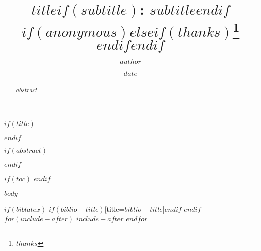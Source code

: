 \documentclass{article}
\title{$title$$if(subtitle)$: $subtitle$$endif$ $if(anonymous)$$else$$if(thanks)$\thanks{$thanks$} $endif$$endif$ }
\author{$author$}
\date{$date$}
\begin{document}
$if(title)$
\maketitle
$endif$

$if(abstract)$

\begin{abstract}
$abstract$
\end{abstract}
$endif$

$if(toc)$
{
\tableofcontents
}
$endif$

$body$

$if(biblatex)$
\printbibliography$if(biblio-title)$[title=$biblio-title$]$endif$
$endif$
$for(include-after)$
$include-after$
$endfor$
\end{document}
